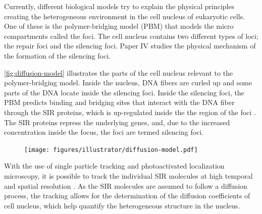 Currently, different biological models try to explain the physical principles creating the heterogeneous environment in the cell nucleus of eukaryotic cells.
One of these is the polymer-bridging model (PBM) that models the micro compartments called the foci. The cell nucleus contains two different types of loci; the repair foci and the silencing foci. Paper IV studies the physical mechanism of the formation of the silencing foci.

\autoref{fig:diffusion-model} illustrates the parts of the cell nucleus relevant to the polymer-bridging model. Inside the nucleus, DNA fibers are curled up and some parts of the DNA locate inside the silencing foci. Inside the silencing foci, the PBM predicts binding and bridging sites that interact with the DNA fiber through the SIR proteins, which is up-regulated inside the the region of the foci \autocite{heltbergPhysicalObservablesDetermine2021}. The SIR proteins repress the underlying genes, and, due to the increased concentration inside the focus, the foci are termed silencing foci.

\begin{figure}[htbp]
    \centering
    \texttt{[image: figures/illustrator/diffusion-model.pdf]}
\end{figure}

With the use of single particle tracking and photoactivated localization microscopy, it is possible to track the individual SIR molecules at high temporal and spatial resolution \autocite{oswaldImagingQuantificationTransmembrane2014,manleyHighdensityMappingSinglemolecule2008}. As the SIR molecules are assumed to follow a diffusion process, the tracking allows for the determination of the diffusion coefficients of cell nucleus, which help quantify the heterogeneous structure in the nucleus.

